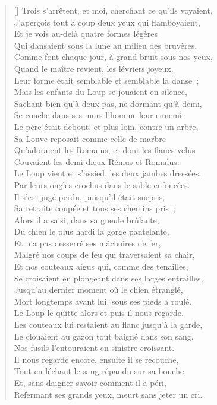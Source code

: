 \documentclass[12pt,a4paper,french]{scrartcl}
\begin{document}
\begin{verse}[\versewidth]
Trois s’arrêtent, et moi, cherchant ce qu’ils voyaient,\\
J’aperçois tout à coup deux yeux qui flamboyaient,\\
Et je vois au-delà quatre formes légères\\
Qui dansaient sous la lune au milieu des bruyères,\\
Comme font chaque jour, à grand bruit sous nos yeux,\\
Quand le maître revient, les lévriers joyeux.\\
Leur forme était semblable et semblable la danse ;\\
Mais les enfants du Loup se jouaient en silence,\\
Sachant bien qu’à deux pas, ne dormant qu’à demi,\\
Se couche dans ses murs l’homme leur ennemi.\\
Le père était debout, et plus loin, contre un arbre,\\
Sa Louve reposait comme celle de marbre\\
Qu’adoraient les Romains, et dont les flancs velus\\
Couvaient les demi-dieux Rémus et Romulus.\\
Le Loup vient et s’assied, les deux jambes dressées,\\
Par leurs ongles crochus dans le sable enfoncées.\\
Il s’est jugé perdu, puisqu’il était surpris,\\
Sa retraite coupée et tous ses chemins pris ;\\
Alors il a saisi, dans sa gueule brûlante,\\
Du chien le plus hardi la gorge pantelante,\\
Et n’a pas desserré ses mâchoires de fer,\\
Malgré nos coups de feu qui traversaient sa chair,\\
Et nos couteaux aigus qui, comme des tenailles,\\
Se croisaient en plongeant dans ses larges entrailles,\\
Jusqu’au dernier moment où le chien étranglé,\\
Mort longtemps avant lui, sous ses pieds a roulé.\\
Le Loup le quitte alors et puis il nous regarde.\\
Les couteaux lui restaient au flanc jusqu’à la garde,\\
Le clouaient au gazon tout baigné dans son sang,\\
Nos fusils l’entouraient en sinistre croissant.\\
Il nous regarde encore, ensuite il se recouche,\\
Tout en léchant le sang répandu sur sa bouche,\\
Et, sans daigner savoir comment il a péri,\\
Refermant ses grands yeux, meurt sans jeter un cri.


\end{verse}
\end{document}
